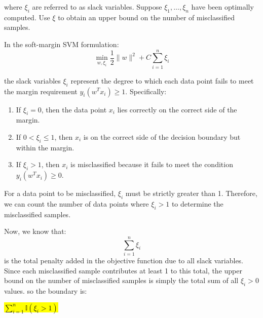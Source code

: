 where \(\xi_i\) are referred to as slack variables. Suppose \(\xi_1, \dots, \xi_n\) have been optimally computed. Use \(\xi\) to obtain an upper bound on the number of misclassified samples.
\begin{qsolve}
	\begin{qsolve}[]
		
In the soft-margin SVM formulation:
\splitqsolve[\splitqsolve]
\[
\min_{w,\xi_i} \frac{1}{2} \|w\|^2 + C \sum_{i=1}^{n} \xi_i
\]

the slack variables \(\xi_i\) represent the degree to which each data point fails to meet the margin requirement \(y_i(w^T x_i) \geq 1\). Specifically:
\begin{enumerate}
	\item If \(\xi_i = 0\), then the data point \(x_i\) lies correctly on the correct side of the margin.
	\item If \(0 < \xi_i \leq 1\), then \(x_i\) is on the correct side of the decision boundary but within the margin.
	\item If \(\xi_i > 1\), then \(x_i\) is misclassified because it fails to meet the condition \(y_i(w^T x_i) \geq 0\).
\end{enumerate}
For a data point to be misclassified, \(\xi_i\) must be strictly greater than 1. Therefore, we can count the number of data points where \(\xi_i > 1\) to determine the misclassified samples.

Now, we know that:
\[
\sum_{i=1}^{n} \xi_i
\]
is the total penalty added in the objective function due to all slack variables. Since each misclassified sample contributes at least 1 to this total, the upper bound on the number of misclassified samples is simply the total sum of all \(\xi_i > 0\) values. so the boundary is:
\begin{center}
	\hl{$ \sum_{i=1}^{n} \mathbb{I}(\xi_i > 1) $}
\end{center}
	\end{qsolve}
\end{qsolve}
